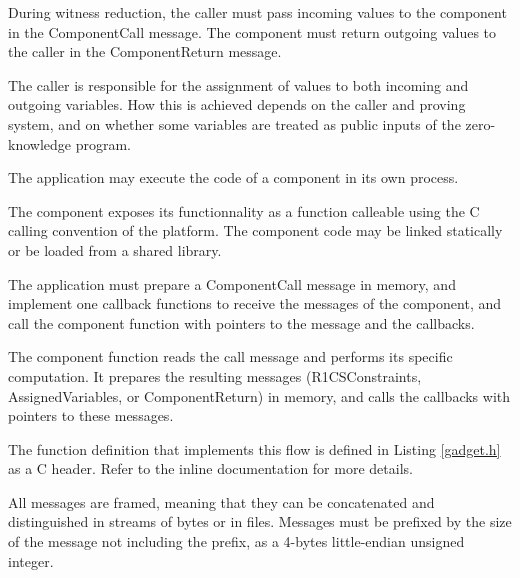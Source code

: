 	During witness reduction, the caller must pass incoming values to the component in the ComponentCall message.
	The component must return outgoing values to the caller in the ComponentReturn message.

	The caller is responsible for the assignment of values to both incoming and outgoing variables.
	How this is achieved depends on the caller and proving system,
	and on whether some variables are treated as public inputs of the zero-knowledge program.


	The application may execute the code of a component in its own process.

	The component exposes its functionnality as a function calleable using the C calling convention of the platform. The component code may be linked statically or be loaded from a shared library.

	The application must prepare a ComponentCall message in memory, and implement one callback functions to receive the messages of the component,
	and call the component function with pointers to the message and the callbacks.

	The component function reads the call message and performs its specific computation. It prepares the resulting messages (R1CSConstraints, AssignedVariables, or ComponentReturn) in memory, and calls the callbacks with pointers to these messages.

	The function definition that implements this flow is defined in Listing \ref{gadget.h} as a C header. Refer to the inline documentation for more details.

	All messages are framed, meaning that they can be concatenated and distinguished in streams of bytes or in files.
	Messages must be prefixed by the size of the message not including the prefix,
	as a 4-bytes little-endian unsigned integer.
